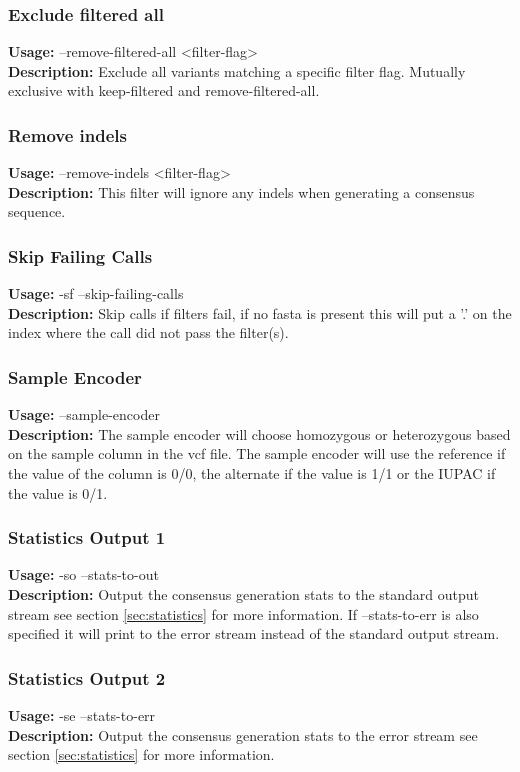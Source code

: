 \subsubsection{Exclude filtered all} 
\textbf{Usage:} --remove-filtered-all <filter-flag>\\
\textbf{Description:} Exclude all variants matching a specific filter flag. Mutually exclusive with keep-filtered and remove-filtered-all.

\subsubsection{Remove indels} 
\textbf{Usage:}  --remove-indels <filter-flag>\\
\textbf{Description:} This filter will ignore any indels when generating a consensus sequence.

\subsubsection{Skip Failing Calls} 
\textbf{Usage:} -sf --skip-failing-calls\\
\textbf{Description:}  Skip calls if filters fail, if no                                        fasta is present this will put a '.' on the index where the call did not pass the filter(s).

\subsubsection{Sample Encoder} 
\textbf{Usage:} --sample-encoder\\
\textbf{Description:} The sample encoder will choose homozygous or heterozygous based on the sample column in the vcf file. The sample encoder will use the reference if the value of the column is 0/0, the alternate if the value is 1/1 or the IUPAC if the value is 0/1.

\subsubsection{Statistics Output 1} 
\textbf{Usage:} -so --stats-to-out\\
\textbf{Description:} Output the consensus generation stats to the standard output stream see section \ref{sec:statistics} for more information. If --stats-to-err is also specified it will print to the error stream instead of the standard output stream.

\subsubsection{Statistics Output 2} 
\textbf{Usage:} -se --stats-to-err\\
\textbf{Description:} Output the consensus generation stats to the error stream see section \ref{sec:statistics} for more information.

